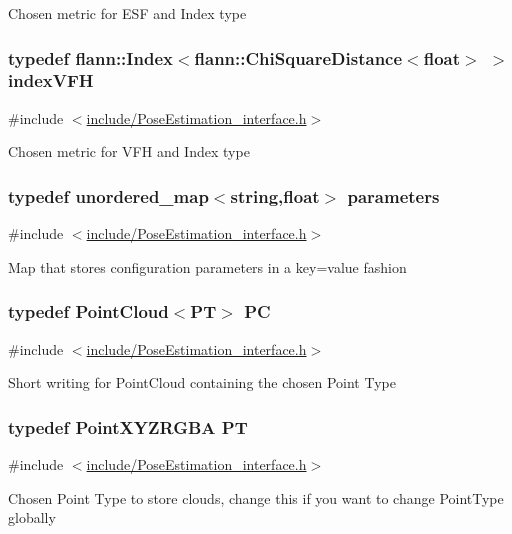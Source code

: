 Chosen metric for E\-S\-F and Index type \hypertarget{group__Definitions_gacea1a4bf0f6b886a58ff00ff9cb54b34}{
\subsubsection[{index\-V\-F\-H}]{\setlength{\rightskip}{0pt plus 5cm}typedef flann\-::\-Index$<$flann\-::\-Chi\-Square\-Distance$<$float$>$ $>$ {\bf index\-V\-F\-H}}}\label{group__Definitions_gacea1a4bf0f6b886a58ff00ff9cb54b34}


{\ttfamily \#include $<$\hyperlink{PoseEstimation__interface_8h}{include/\-Pose\-Estimation\-\_\-interface.\-h}$>$}

Chosen metric for V\-F\-H and Index type \hypertarget{group__Definitions_gacbb28d8f791bb363852e522cf3b83c47}{
\subsubsection[{parameters}]{\setlength{\rightskip}{0pt plus 5cm}typedef unordered\-\_\-map$<$string,float$>$ {\bf parameters}}}\label{group__Definitions_gacbb28d8f791bb363852e522cf3b83c47}


{\ttfamily \#include $<$\hyperlink{PoseEstimation__interface_8h}{include/\-Pose\-Estimation\-\_\-interface.\-h}$>$}

Map that stores configuration parameters in a key=value fashion \hypertarget{group__Definitions_ga62eb21fcfa3189c5de50fb62a2a7a79e}{
\subsubsection[{P\-C}]{\setlength{\rightskip}{0pt plus 5cm}typedef Point\-Cloud$<${\bf P\-T}$>$ {\bf P\-C}}}\label{group__Definitions_ga62eb21fcfa3189c5de50fb62a2a7a79e}


{\ttfamily \#include $<$\hyperlink{PoseEstimation__interface_8h}{include/\-Pose\-Estimation\-\_\-interface.\-h}$>$}

Short writing for Point\-Cloud containing the chosen Point Type \hypertarget{group__Definitions_ga102df08e7bbccbe3fa6e0b53fd9bac74}{
\subsubsection[{P\-T}]{\setlength{\rightskip}{0pt plus 5cm}typedef Point\-X\-Y\-Z\-R\-G\-B\-A {\bf P\-T}}}\label{group__Definitions_ga102df08e7bbccbe3fa6e0b53fd9bac74}


{\ttfamily \#include $<$\hyperlink{PoseEstimation__interface_8h}{include/\-Pose\-Estimation\-\_\-interface.\-h}$>$}

Chosen Point Type to store clouds, change this if you want to change Point\-Type globally 